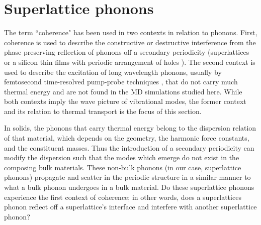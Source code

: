 \begin{comment}
The noise in the contribution distribution at longer MFPs is consequence of the limited resolution of the Brouillin zone enforced by the MD domain. This has been observed in other mode by mode analysis techniques, such as the real space force constant extraction from DFT method used by Esfarjani, where the limited resolution manifested in a stepwise behavior of thermal conductivity accumulation function of bulk silicon. \cite{PhysRevB.84.085204} The linear behavior of the dispersion near the gamma point of the Brouillin zone and the $\omega^{-2}$ scaling of the lifetimes allowed for the contribution of these unresolved long-wavelength modes to be estimated. The linear extrapolation procedure used to predict bulk thermal conductivities \cite{PhysRevB.81.214305} was not used in previous superlattice studies \cite{doi:10.1021/nl202186y,Luckyanova16112012} and is not used here. The complicated dispersion [Fig.~\ref{fig:dispersion}(a-c)] does not guarantee that such an approach is viable, as such, understanding size effects in superlattices warrants further work.
\end{comment}

\section{Superlattice phonons}\label{SEC:sl_phon}

The term ``coherence" has been used in two contexts in relation to phonons. First, coherence is used to describe the constructive or destructive interference from the phase preserving reflection of phonons off a secondary periodicity (superlattices or a silicon thin films with periodic arrangement of holes \cite{doi:10.1021/nl102918q}). The second context is used to describe the excitation of long wavelength phonons, usually by femtosecond time-resolved pump-probe techniques \cite{PhysRevLett.73.740,PhysRevB.75.195309}, that do not carry much thermal energy and are not found in the MD simulations studied here. While both contexts imply the wave picture of vibrational modes, the former context and its relation to thermal transport is the focus of this section.

In solids, the phonons that carry thermal energy belong to the dispersion relation of that material, which depends on the geometry, the harmonic force constants, and the constituent masses. Thus the introduction of a secondary periodicity can modify the dispersion such that the modes which emerge do not exist in the composing bulk materials. These non-bulk phonons (in our case, superlattice phonons) propagate and scatter in the periodic structure in a similar manner to what a bulk phonon undergoes in a bulk material. Do these superlattice phonons experience the first context of coherence; in other words, does a superlattices phonon reflect off a superlattice's interface and interfere with another superlattice phonon?%

